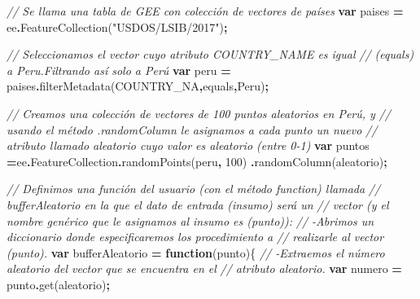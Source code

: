 \documentclass[
  12pt,
  letterpaper,
  twoside]{book}
\newenvironment{Shaded}{\begin{snugshade}}{\end{snugshade}}
\newcommand{\AttributeTok}[1]{\textcolor[rgb]{0.77,0.63,0.00}{#1}}
\newcommand{\CommentTok}[1]{\textcolor[rgb]{0.56,0.35,0.01}{\textit{#1}}}
\newcommand{\DecValTok}[1]{\textcolor[rgb]{0.00,0.00,0.81}{#1}}
\newcommand{\FunctionTok}[1]{\textcolor[rgb]{0.00,0.00,0.00}{#1}}
\newcommand{\KeywordTok}[1]{\textcolor[rgb]{0.13,0.29,0.53}{\textbf{#1}}}
\newcommand{\NormalTok}[1]{#1}
\newcommand{\OperatorTok}[1]{\textcolor[rgb]{0.81,0.36,0.00}{\textbf{#1}}}
\newcommand{\StringTok}[1]{\textcolor[rgb]{0.31,0.60,0.02}{#1}}
\begin{document}
\begin{Shaded}
\begin{Highlighting}[]
\CommentTok{// Se llama una tabla de GEE con colección de vectores de países }
\KeywordTok{var}\NormalTok{ paises }\OperatorTok{=}\NormalTok{ ee}\OperatorTok{.}\FunctionTok{FeatureCollection}\NormalTok{(}\StringTok{"USDOS/LSIB/2017"}\NormalTok{)}\OperatorTok{;} 

\CommentTok{//  Seleccionamos el vector cuyo atributo \textquotesingle{}COUNTRY\_NAME\textquotesingle{} es igual }
\CommentTok{// (\textquotesingle{}equals\textquotesingle{}) a \textquotesingle{}Peru\textquotesingle{}.Filtrando así solo a Perú }
\KeywordTok{var}\NormalTok{ peru }\OperatorTok{=}\NormalTok{ paises}\OperatorTok{.}\FunctionTok{filterMetadata}\NormalTok{(}\StringTok{\textquotesingle{}COUNTRY\_NA\textquotesingle{}}\OperatorTok{,}\StringTok{\textquotesingle{}equals\textquotesingle{}}\OperatorTok{,}\StringTok{\textquotesingle{}Peru\textquotesingle{}}\NormalTok{)}\OperatorTok{;} 

\CommentTok{// Creamos una colección de vectores de 100 puntos aleatorios en Perú, y }
\CommentTok{// usando el método .randomColumn le asignamos a cada punto un nuevo }
\CommentTok{// atributo llamado \textquotesingle{}aleatorio\textquotesingle{} cuyo valor es aleatorio (entre 0{-}1)}
\KeywordTok{var}\NormalTok{ puntos }\OperatorTok{=}\NormalTok{ee}\OperatorTok{.}\AttributeTok{FeatureCollection}\OperatorTok{.}\FunctionTok{randomPoints}\NormalTok{(peru}\OperatorTok{,} \DecValTok{100}\NormalTok{)}
  \OperatorTok{.}\FunctionTok{randomColumn}\NormalTok{(}\StringTok{\textquotesingle{}aleatorio\textquotesingle{}}\NormalTok{)}\OperatorTok{;}  

\CommentTok{//  Definimos una función del usuario (con el método \textasciigrave{}function\textasciigrave{}) llamada }
\CommentTok{//  \textquotesingle{}bufferAleatorio\textquotesingle{} en la que el dato de entrada (insumo) será un }
\CommentTok{//  vector (y el nombre genérico que le asignamos al insumo es (punto)):}
\CommentTok{//  {-}Abrimos un diccionario donde especificaremos los procedimiento a }
\CommentTok{//  realizarle al vector (punto).}
\KeywordTok{var}\NormalTok{ bufferAleatorio }\OperatorTok{=} \KeywordTok{function}\NormalTok{(punto)\{   }
  \CommentTok{//  {-}Extraemos el número aleatorio del vector que se encuentra en el }
  \CommentTok{//  atributo \textquotesingle{}aleatorio\textquotesingle{}.}
  \KeywordTok{var}\NormalTok{ numero }\OperatorTok{=}\NormalTok{ punto}\OperatorTok{.}\FunctionTok{get}\NormalTok{(}\StringTok{\textquotesingle{}aleatorio\textquotesingle{}}\NormalTok{)}\OperatorTok{;}  
 

\end{Highlighting}
\end{Shaded}
\end{document}
